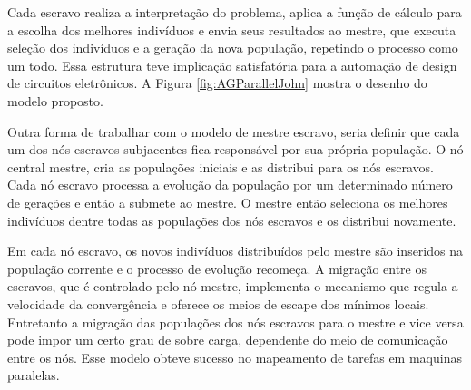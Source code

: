 Cada escravo realiza a interpretação do problema, aplica a função de cálculo para a escolha dos melhores indivíduos e envia seus resultados ao mestre, que executa seleção dos indivíduos e a geração da nova população, repetindo o processo como um todo. Essa estrutura teve implicação satisfatória para a automação de design de circuitos eletrônicos\cite{Jason}. A Figura \ref{fig:AGParallelJohn} mostra o desenho do modelo proposto.

\begin{minipage}{\linewidth}
	\label{fig:AGParallelJohn}
\end{minipage}

Outra forma de trabalhar com o modelo de mestre escravo, seria definir que cada um dos nós escravos subjacentes fica responsável por sua própria população. O nó central mestre, cria as populações iniciais e as distribui para os nós escravos. Cada nó escravo processa a evolução da população por um determinado número de gerações e então a submete ao mestre. O mestre então seleciona os melhores indivíduos dentre todas as populações dos nós escravos e os distribui novamente. 

Em cada nó escravo, os novos indivíduos distribuídos pelo mestre são inseridos na população corrente e o processo de evolução recomeça. A migração entre os escravos, que é controlado pelo nó mestre, implementa o mecanismo que regula a velocidade da convergência e oferece os meios de escape dos mínimos locais. Entretanto a migração das populações dos nós escravos para o mestre e vice versa pode impor um certo grau de sobre carga, dependente do meio de comunicação entre os nós. Esse modelo obteve sucesso no mapeamento de tarefas em maquinas paralelas. \cite{Alaoui}

